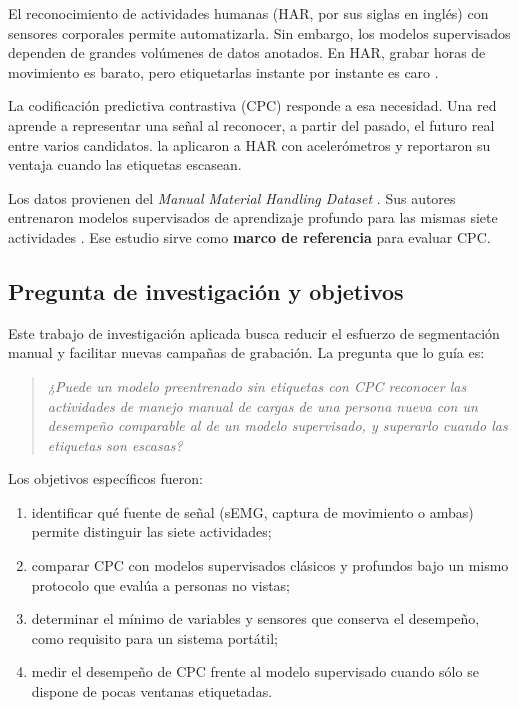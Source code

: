\documentclass[letterpaper,11pt]{article}
\begin{document}
El reconocimiento de actividades humanas (HAR, por sus siglas en inglés) con sensores corporales permite automatizarla. Sin embargo, los modelos supervisados dependen de grandes volúmenes de datos anotados. En HAR, grabar horas de movimiento es barato, pero etiquetarlas instante por instante es caro \parencite{haresamudram2021}.

La codificación predictiva contrastiva (CPC) \parencite{vandenoord2018} responde a esa necesidad. Una red aprende a representar una señal al reconocer, a partir del pasado, el futuro real entre varios candidatos. \textcite{haresamudram2021} la aplicaron a HAR con acelerómetros y reportaron su ventaja cuando las etiquetas escasean.

Los datos provienen del \emph{Manual Material Handling Dataset} \parencite{bassani2021dataset}. Sus autores entrenaron modelos supervisados de aprendizaje profundo para las mismas siete actividades \parencite{bassani2025}. Ese estudio sirve como \textbf{marco de referencia} para evaluar CPC.

\subsection{Pregunta de investigación y objetivos}
Este trabajo de investigación aplicada busca reducir el esfuerzo de segmentación manual y facilitar nuevas campañas de grabación. La pregunta que lo guía es:

\begin{quote}
\emph{¿Puede un modelo preentrenado sin etiquetas con CPC reconocer las actividades de manejo manual de cargas de una persona nueva con un desempeño comparable al de un modelo supervisado, y superarlo cuando las etiquetas son escasas?}
\end{quote}

\noindent Los objetivos específicos fueron:
\begin{enumerate}
  \item identificar qué fuente de señal (sEMG, captura de movimiento o ambas) permite distinguir las siete actividades;
  \item comparar CPC con modelos supervisados clásicos y profundos bajo un mismo protocolo que evalúa a personas no vistas;
  \item determinar el mínimo de variables y sensores que conserva el desempeño, como requisito para un sistema portátil;
  \item medir el desempeño de CPC frente al modelo supervisado cuando sólo se dispone de pocas ventanas etiquetadas.
\end{enumerate}
\end{document}
